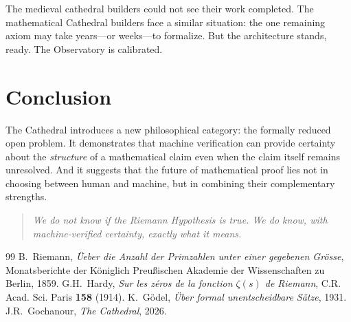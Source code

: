 \documentclass[11pt,a4paper]{article}
\begin{document}
The medieval cathedral builders could not see their work completed.
The mathematical Cathedral builders face a similar situation: the
one remaining axiom may take years---or weeks---to formalize.
But the architecture stands, ready. The Observatory is calibrated.

\section{Conclusion}

The Cathedral introduces a new philosophical category: the formally
reduced open problem. It demonstrates that machine verification can
provide certainty about the \emph{structure} of a mathematical claim
even when the claim itself remains unresolved. And it suggests that
the future of mathematical proof lies not in choosing between human
and machine, but in combining their complementary strengths.

\begin{quote}
\emph{We do not know if the Riemann Hypothesis is true.
We do know, with machine-verified certainty, exactly what it means.}
\end{quote}

\begin{thebibliography}{99}
B.~Riemann, \emph{\"Ueber die Anzahl der Primzahlen unter einer
gegebenen Gr\"osse}, Monatsberichte der K\"oniglich Preu\ss ischen
Akademie der Wissenschaften zu Berlin, 1859.
G.H.~Hardy, \emph{Sur les z\'eros de la fonction $\zeta(s)$ de
Riemann}, C.R. Acad. Sci. Paris \textbf{158} (1914).
K.~G\"odel, \emph{\"Uber formal unentscheidbare S\"atze}, 1931.
J.R.~Gochanour, \emph{The Cathedral}, 2026.
\end{thebibliography}
\end{document}
